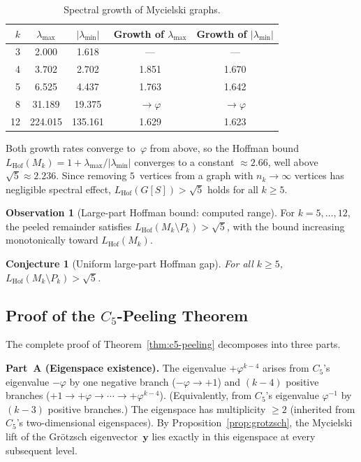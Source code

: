 \documentclass[11pt,a4paper]{amsart}
\theoremstyle{plain}
\newtheorem{conjecture}[theorem]{Conjecture}
\theoremstyle{definition}
\newtheorem{observation}[theorem]{Observation}
\theoremstyle{remark}
\newcommand{\vp}{\varphi}
\newcommand{\LHof}{L_{\mathrm{Hof}}}
\begin{document}
\begin{table}[ht]
\centering
\caption{Spectral growth of Mycielski graphs.}
\label{tab:spectral-growth}
\begin{tabular}{rcccc}
\toprule
$k$ & $\lambda_{\max}$ & $|\lambda_{\min}|$
  & Growth of $\lambda_{\max}$ & Growth of $|\lambda_{\min}|$ \\
\midrule
 3 &   2.000 &   1.618 & ---   & --- \\
 4 &   3.702 &   2.702 & 1.851 & 1.670 \\
 5 &   6.525 &   4.437 & 1.763 & 1.642 \\
 8 &  31.189 &  19.375 & $\to\vp$ & $\to\vp$ \\
12 & 224.015 & 135.161 & 1.629 & 1.623 \\
\bottomrule
\end{tabular}
\end{table}

Both growth rates converge to~$\vp$ from above, so the Hoffman bound
$\LHof(M_k) = 1 + \lambda_{\max}/|\lambda_{\min}|$ converges to a constant
$\approx 2.66$, well above $\sqrt{5} \approx 2.236$.  Since removing
$5$~vertices from a graph with $n_k \to \infty$ vertices has negligible
spectral effect, $\LHof(G[S]) > \sqrt{5}$ holds for all $k \geq 5$.

\begin{observation}[Large-part Hoffman bound: computed range]\label{obs:hoffman-large}
For $k = 5,\ldots,12$, the peeled remainder satisfies
$\LHof(M_k \setminus P_k) > \sqrt{5}$, with the bound increasing
monotonically toward $\LHof(M_k)$.
\end{observation}

\begin{conjecture}[Uniform large-part Hoffman gap]\label{conj:hoffman-large}
For all $k \geq 5$, $\LHof(M_k \setminus P_k) > \sqrt{5}$.
\end{conjecture}

\subsection{Proof of the \texorpdfstring{$C_5$}{C₅}-Peeling Theorem}
\label{ssec:proof-peeling}

The complete proof of Theorem~\ref{thm:c5-peeling} decomposes into three parts.

\medskip\noindent
\textbf{Part~A (Eigenspace existence).}
The eigenvalue $+\vp^{k-4}$ arises from $C_5$'s eigenvalue $-\vp$ by one
negative branch ($-\vp \to +1$) and $(k-4)$ positive branches
($+1 \to +\vp \to \cdots \to +\vp^{k-4}$).  (Equivalently, from $C_5$'s
eigenvalue $\vp^{-1}$ by $(k-3)$ positive branches.)  The eigenspace has
multiplicity $\geq 2$ (inherited from $C_5$'s two-dimensional eigenspaces).  By
Proposition~\ref{prop:grotzsch}, the Mycielski lift of the Gr\"otzsch
eigenvector~$\mathbf{y}$ lies exactly in this eigenspace at every subsequent
level.
\end{document}
